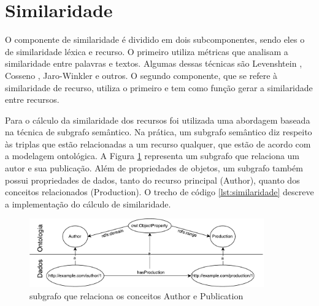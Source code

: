 \section*{Similaridade}
O componente de similaridade é dividido em dois subcomponentes, sendo eles o de similaridade léxica e recurso. O primeiro utiliza métricas que analisam a similaridade entre palavras e textos. Algumas dessas técnicas são Levenshtein \cite{levenshtein1966binary}, Cosseno \cite{singhal2001modern}, Jaro-Winkler \cite{winkler1990string} e outros. O segundo componente, que se refere à similaridade de recurso, utiliza o primeiro e tem como função gerar a similaridade entre recursos.

Para o cálculo da similaridade dos recursos foi utilizada uma abordagem baseada na técnica de subgrafo semântico. Na prática, um subgrafo semântico diz respeito às triplas que estão relacionadas a um recurso qualquer, que estão de acordo com a modelagem ontológica. A Figura \ref{fig:subgrafo} representa um subgrafo que relaciona um autor e sua publicação. Além de propriedades de objetos, um subgrafo também possui propriedades de dados, tanto do recurso principal (Author), quanto dos conceitos relacionados (Production). O trecho de código \ref{lst:similaridade} descreve a implementação do cálculo de similaridade.

\begin{figure}[!ht]
	\centering
	\includegraphics[width=0.9\textwidth]{./imagens/subgrafo_semantico.pdf}
    \caption{subgrafo que relaciona os conceitos Author e Publication}
	\label{fig:subgrafo}
\end{figure}

